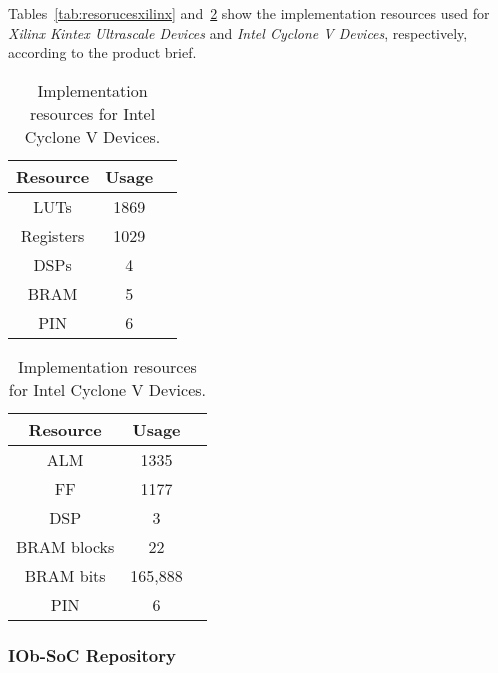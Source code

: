 Tables~\ref{tab:resorucesxilinx} and~\ref{tab:resorucescyclone} show the implementation resources used for \textit{Xilinx Kintex Ultrascale Devices} and \textit{Intel Cyclone V Devices}, respectively, according to the product brief.

\vspace{0.8cm}

\begin{table}[H]
\parbox{.45\linewidth}{
\centering
\begin{tabular}{|c|c|c|}
        \hline
         \textbf{Resource} & \textbf{Usage}  \\
         \hline
         LUTs & 1869 \\
         \hline
         Registers & 1029 \\
         \hline
         DSPs & 4 \\
         \hline
         BRAM & 5 \\
         \hline
         PIN & 6 \\
         \hline
\end{tabular}
\caption{Implementation resources for \textit{Xilinx Kintex
Ultrascale} Devices.}
\label{tab:resorucesxilinx}
}
\hfill
\parbox{.45\linewidth}{
\centering
\begin{tabular}{|c|c|c|}
        \hline
         \textbf{Resource} & \textbf{Usage}  \\
         \hline
         ALM & 1335 \\
         \hline
         FF & 1177 \\
         \hline
         DSP & 3 \\
         \hline
         BRAM blocks & 22 \\
         \hline
         BRAM bits & 165,888 \\
         \hline
         PIN & 6 \\
         \hline
\end{tabular}
\caption{Implementation resources for Intel Cyclone
V Devices.}
\label{tab:resorucescyclone}
}
\end{table}


\subsubsection{IOb-SoC Repository}

